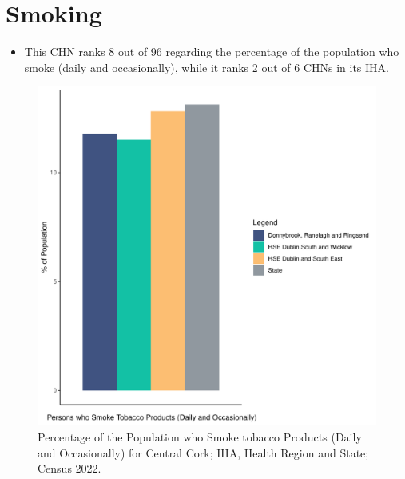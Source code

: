 \documentclass{article}
\begin{document}
\pagebreak

\section{Smoking}\label{sect:Smoking}
\begin{itemize}
\item This CHN ranks  8 out of 96 regarding the percentage of the population who smoke (daily and occasionally), while it ranks   2 out of 6 CHNs in its IHA.
\end{itemize}
\begin{figure}[H]
	\centering
	\includegraphics[width = 120mm]{../figures/SmokingED.pdf}
	\caption{Percentage of the Population who Smoke tobacco Products (Daily and Occasionally) for Central Cork; IHA, Health Region and State; Census 2022.}
	\label{fig:2ae19629-1a6a-13a3-e055-000000000001}
	\end{figure}
	
\end{document}
